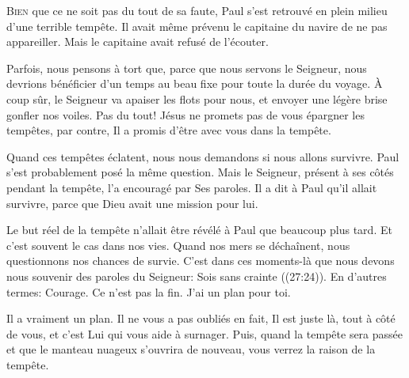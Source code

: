 


\lettrine{B}{ien} que ce ne soit pas du tout de sa faute,
 Paul s'est retrouvé en plein milieu d'une terrible tempête.
 Il avait même prévenu le capitaine du navire de ne pas appareiller.
 Mais le capitaine avait refusé de l'écouter.

Parfois, nous pensons à tort que, parce que nous servons le Seigneur,
 nous devrions bénéficier d'un temps au beau fixe pour toute la durée du voyage.
 À coup sûr, le Seigneur va apaiser les flots pour nous,
 et envoyer une légère brise gonfler nos voiles. Pas du tout!
 Jésus ne promets pas de vous épargner les tempêtes, par contre,
 Il a promis d'être avec vous dans la tempête.


Quand ces tempêtes éclatent, nous nous demandons si nous allons survivre.
 Paul s'est probablement posé la même question.
 Mais le Seigneur, présent à ses côtés pendant la tempête,
 l'a encouragé par Ses paroles.
 Il a dit à Paul qu'il allait survivre,
 parce que Dieu avait une mission pour lui.

Le but réel de la tempête n'allait être révélé à Paul que beaucoup plus tard.
 Et c'est souvent le cas dans nos vies. Quand nos mers se déchaînent,
 nous questionnons nos chances de survie.
 C'est dans ces moments-là que nous devons nous souvenir des paroles du Seigneur:
 \Og Sois sans crainte \Fg{} ((27:24)).
 En d'autres termes: 
 \Og Courage. Ce n'est pas la fin. J'ai un plan pour toi. \Fg{}

Il a vraiment un plan. Il ne vous a pas oubliés \ocadr en fait,
 Il est juste là, tout à côté de vous, et c'est Lui qui vous aide à surnager.
 Puis, quand la tempête sera passée et que le manteau nuageux s'ouvrira de nouveau,
 vous verrez la raison de la tempête.

\dvrule



